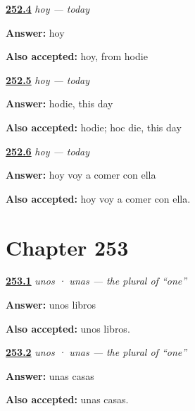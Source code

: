 \noindent\begin{minipage}[t]{\linewidth}
\raggedright
\hyperlink{review-ES-C65-hoy-word}{\textbf{252.4}} \emph{hoy — today}\par
\small \textbf{Answer:} hoy\par
\footnotesize \textbf{Also accepted:} hoy, from hodie
\end{minipage}\par\medskip

\noindent\begin{minipage}[t]{\linewidth}
\raggedright
\hyperlink{review-ES-C65-hoy-latin}{\textbf{252.5}} \emph{hoy — today}\par
\small \textbf{Answer:} hodie, this day\par
\footnotesize \textbf{Also accepted:} hodie; hoc die, this day
\end{minipage}\par\medskip

\noindent\begin{minipage}[t]{\linewidth}
\raggedright
\hyperlink{review-ES-C65-hoy-tense}{\textbf{252.6}} \emph{hoy — today}\par
\small \textbf{Answer:} hoy voy a comer con ella\par
\footnotesize \textbf{Also accepted:} hoy voy a comer con ella.
\end{minipage}\par\medskip

\section*{Chapter 253}

\noindent\begin{minipage}[t]{\linewidth}
\raggedright
\hyperlink{review-ES-C65-unos-unas-say}{\textbf{253.1}} \emph{unos · unas — the plural of \textquotedblleft{}one\textquotedblright{}}\par
\small \textbf{Answer:} unos libros\par
\footnotesize \textbf{Also accepted:} unos libros.
\end{minipage}\par\medskip

\noindent\begin{minipage}[t]{\linewidth}
\raggedright
\hyperlink{review-ES-C65-unos-unas-fem}{\textbf{253.2}} \emph{unos · unas — the plural of \textquotedblleft{}one\textquotedblright{}}\par
\small \textbf{Answer:} unas casas\par
\footnotesize \textbf{Also accepted:} unas casas.
\end{minipage}\par\medskip

